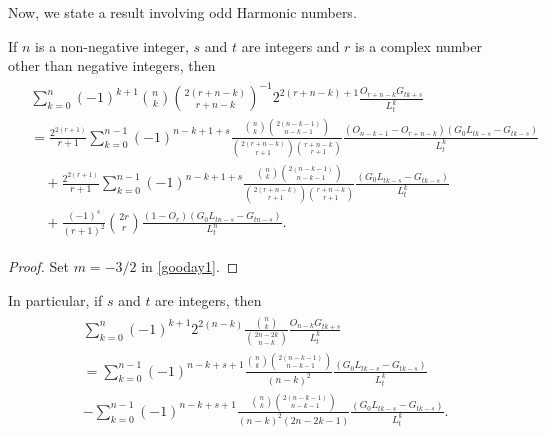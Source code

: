 \documentclass[12pt,reqno]{article}
\begin{document}
Now, we state a result involving odd Harmonic numbers.
\begin{corollary}
If $n$ is a non-negative integer, $s$ and $t$ are integers and $r$ is a complex number other than negative integers, then 
\begin{align}\label{go14}
\begin{split}
&\sum_{k=0}^n(-1)^{k+1}\binom{n}{k}\binom{2(r+n-k)}{r+n-k}^{-1}2^{2(r+n-k)+1}\frac{O_{r+n-k}G_{tk+s}}{L_t^k} \\
&= \frac{2^{2(r+1)}}{r+1}\sum_{k=0}^{n-1}(-1)^{n-k+1+s}\frac{\binom{n}{k}\binom{2(n-k-1)}{n-k-1}}{\binom{2(r+n-k)}{r+1}\binom{r+n-k}{r+1}}\frac{\left(O_{n-k-1}-O_{r+n-k}\right)\left(G_0L_{tk-s}-G_{tk-s}\right)}{L_t^k}\\
&\quad +\frac{2^{2(r+1)}}{r+1}\sum_{k=0}^{n-1}(-1)^{n-k+1+s}\frac{\binom{n}{k}\binom{2(n-k-1)}{n-k-1}}{\binom{2(r+n-k)}{r+1}\binom{r+n-k}{r+1}}\frac{\left(G_0L_{tk-s}-G_{tk-s}\right)}{L_t^k} \\
&\quad +\frac{(-1)^s}{(r+1)^2}\binom{2r}{r}\frac{(1-O_r)\left(G_0L_{tn-s}-G_{tn-s}\right)}{L_t^n}.
\end{split}
\end{align}
\end{corollary}
\begin{proof}
Set $m=-3/2$ in \eqref{gooday1}.
\end{proof}
In particular, if $s$ and $t$ are integers, then
\begin{align}\label{may10}
\begin{split}
&\sum_{k=0}^n (-1)^{k+1}2^{2(n-k)}\frac{\binom{n}{k}}{\binom{2n-2k}{n-k}}\frac{O_{n-k}G_{tk+s}}{L_t^k}\\
&=\sum_{k=0}^{n-1}(-1)^{n-k+s+1}\frac{\binom{n}{k}\binom{2(n-k-1)}{n-k-1}}{(n-k)^2}\frac{\left(G_0L_{tk-s}-G_{tk-s}\right)}{L_t^k} \\
&-\sum_{k=0}^{n-1}(-1)^{n-k+s+1}\frac{\binom{n}{k}\binom{2(n-k-1)}{n-k-1}}{(n-k)^2(2n-2k-1)}\frac{\left(G_0L_{tk-s}-G_{tk-s}\right)}{L_t^k}.
\end{split}
\end{align}
\end{document}
